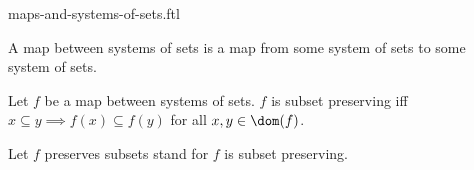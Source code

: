 \documentclass{naproche-library}
\begin{document}
\begin{smodule}[title=Maps and Systems of Sets]{maps-and-systems-of-sets.ftl}

\begin{definition}[forthel,id=FOUNDATIONS_10_1394550966845440]
  A map between systems of sets is a map from some system of sets to some system of sets.
\end{definition}

\begin{definition}[forthel,id=FOUNDATIONS_10_3290499861446656]
  Let $f$ be a map between systems of sets.
  $f$ is subset preserving iff $x \subseteq y \implies f(x) \subseteq f(y)$ for all $x, y \in \dom(f)$.

  Let $f$ preserves subsets stand for $f$ is subset preserving.
\end{definition}
\end{smodule}
\end{document}
